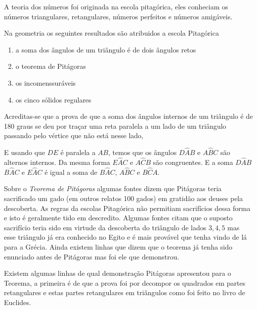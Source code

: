 \documentclass{article}
\begin{document}
A teoria dos números foi originada na escola pitagórica, eles conheciam
os números triangulares, retangulares, números perfeitos e números amigáveis.

Na geometria os seguintes resultados são atribuidos a escola Pitagórica
\begin{enumerate}
	\item a soma dos ângulos de um triângulo é de dois ângulos retos
	\item o teorema de Pitágoras
	\item os incomenssuráveis
	\item os cinco sólidos regulares
\end{enumerate}

Acreditas-se que a prova de que a soma dos ângulos internos de um triângulo
é de 180 graus se deu por traçar uma reta paralela a um lado de um triângulo
passando pelo vértice que não está nesse lado,

\begin{center}
\end{center}
E usando que $DE$ é paralela a $AB$, temos que os ângulos $D \widehat A B$ 
e $A \widehat BC$ são alternos internos. Da mesma forma $E \widehat A C$ e 
$A \widehat C B$ são congruentes. E a soma $D \widehat AB$ $B \widehat AC$ e
$E \widehat AC$ é igual a soma de $B \widehat A C$, $A \widehat BC$ e $B \widehat C A$.


Sobre o \emph{Teorema de Pitágoras} algumas fontes dizem que Pitágoras 
teria sacrificado um gado (em outros relatos 100 gados) em gratidão aos
deuses pela descoberta. As regras da escolas Pitagórica não permitiam
sacrifícios dessa forma e isto é geralmente tido em descredito. Algumas 
fontes citam que o suposto sacrifício teria sido em virtude da descoberta
do triângulo de lados $3, 4, 5$ mas esse triângulo já era conhecido
no Egito e é mais provável que tenha vindo de lá para a Grécia. Ainda 
existem linhas que dizem que o teorema já tenha sido enunciado antes de 
Pitágoras mas foi ele que demonstrou.

Existem algumas linhas de qual demonstração Pitágoras apresentou para o Teorema, 
a primeira é de que a prova foi por decompor os quadrados em partes retangulares e
estas partes retangulares em triângulos como foi feito no livro de Euclides.
\end{document}
